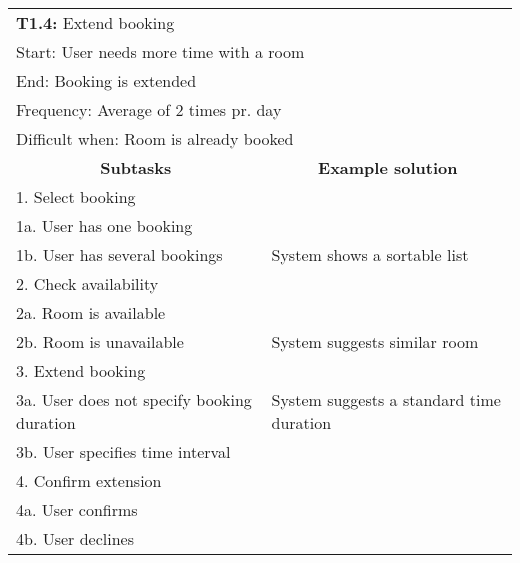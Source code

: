 \begin{tabular}{|p{6cm}|p{6cm}|}
\hline 
	\multicolumn{2}{|l|}{\textbf{T1.4:} \hspace{26mm}Extend booking} \\
	\multicolumn{2}{|l|}{Start: \hspace{26mm}User needs more time with a room} \\
	\multicolumn{2}{|l|}{End: \hspace{28mm}Booking is extended } \\
	\multicolumn{2}{|l|}{Frequency: \hspace{17mm}Average of 2 times pr. day} \\
	\multicolumn{2}{|l|}{Difficult when: \hspace{10mm}Room is already booked} \\ \hline
	\multicolumn{1}{|c|}{\textbf{Subtasks}} & \multicolumn{1}{c|}{\textbf{Example solution}} \\ \hline
	1.  Select booking & \\
	1a. User has one booking & \\
	1b. User has several bookings & System shows a sortable list \\ \hline
	2. Check availability & \\
	2a. Room is available & \\
	2b. Room is unavailable & System suggests similar room \\ \hline
	3.  Extend booking & \\
	3a. User does not specify booking duration & System suggests a standard time duration \\
	3b. User specifies time interval & \\ \hline
	4. Confirm extension & \\
	4a. User confirms & \\
	4b. User declines & \\ \hline
\end{tabular}
